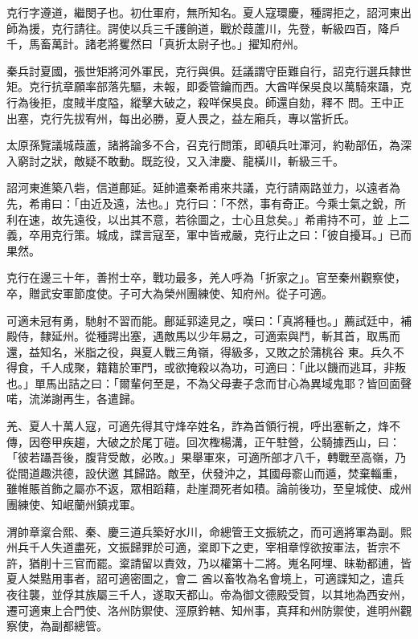 \begin{pinyinscope}
 克行字遵道，繼閔子也。初仕軍府，無所知名。夏人寇環慶，種諤拒之，詔河東出師為援，克行請往。諤使以兵三千護餉道，戰於葭蘆川，先登，斬級四百，降戶千，馬畜萬計。諸老將矍然曰「真折太尉子也。」擢知府州。



 秦兵討夏國，張世矩將河外軍民，克行與俱。廷議謂守臣難自行，詔克行選兵隸世矩。克行抗章願率部落先驅，未報，即委管鑰而西。大酋咩保吳良以萬騎來躡，克行為後拒，度賊半度隘，縱擊大破之，殺咩保吳良。師還自劾，釋不
 問。王中正出塞，克行先拔宥州，每出必勝，夏人畏之，益左廂兵，專以當折氏。



 太原孫覽議城葭蘆，諸將論多不合，召克行問策，即頓兵吐渾河，約勒部伍，為深入窮討之狀，敵疑不敢動。既訖役，又入津慶、龍橫川，斬級三千。



 詔河東進築八砦，信道鄜延。延帥遣秦希甫來共議，克行請兩路並力，以遠者為先，希甫曰：「由近及遠，法也。」克行曰：「不然，事有奇正。今乘士氣之銳，所利在速，故先遠役，以出其不意，若徐圖之，士心且怠矣。」希甫持不可，並
 上二義，卒用克行策。城成，諜言寇至，軍中皆戒嚴，克行止之曰：「彼自擾耳。」已而果然。



 克行在邊三十年，善拊士卒，戰功最多，羌人呼為「折家之」。官至秦州觀察使，卒，贈武安軍節度使。子可大為榮州團練使、知府州。從子可適。



 可適未冠有勇，馳射不習而能。鄜延郭逵見之，嘆曰：「真將種也。」薦試廷中，補殿侍，隸延州。從種諤出塞，遇敵馬以少年易之，可適索與鬥，斬其首，取馬而還，益知名，米脂之役，與夏人戰三角嶺，得級多，又敗之於蒲桃谷
 東。兵久不得食，千人成聚，籍籍於軍門，或欲掩殺以為功，可適曰：「此以饑而逃耳，非叛也。」單馬出詰之曰：「爾輩何至是，不為父母妻子念而甘心為異域鬼耶？皆回面聲喏，流涕謝再生，各遣歸。



 羌、夏人十萬人寇，可適先得其守烽卒姓名，詐為首領行視，呼出塞斬之，烽不傳，因卷甲疾趨，大破之於尾丁磑。回次檉楊溝，正午駐營，公騎據西山，曰：「彼若躡吾後，腹背受敵，必敗。」果舉軍來，可適所部才八千，轉戰至高嶺，乃從間道趣洪德，設伏邀
 其歸路。敵至，伏發沖之，其國母窬山而遁，焚棄輜重，雖帷賬首飾之屬亦不返，眾相蹈藉，赴崖澗死者如積。論前後功，至皇城使、成州團練使、知岷蘭州鎮戎軍。



 渭帥章楶合熙、秦、慶三道兵築好水川，命總管王文振統之，而可適將軍為副。熙州兵千人失道盡死，文振歸罪於可適，楶即下之吏，宰相章惇欲按軍法，哲宗不許，猶削十三官而罷。楶請留以責效，乃以權第十二將。嵬名阿埋、昧勒都逋，皆夏人桀黠用事者，詔可適密圖之，會二
 酋以畜牧為名會境上，可適諜知之，遣兵夜往襲，並俘其族屬三千人，遂取天都山。帝為御文德殿受賀，以其地為西安州，遷可適東上合門使、洛州防禦使、涇原鈐轄、知州事，真拜和州防禦使，進明州觀察使，為副都總管。




\end{pinyinscope}
